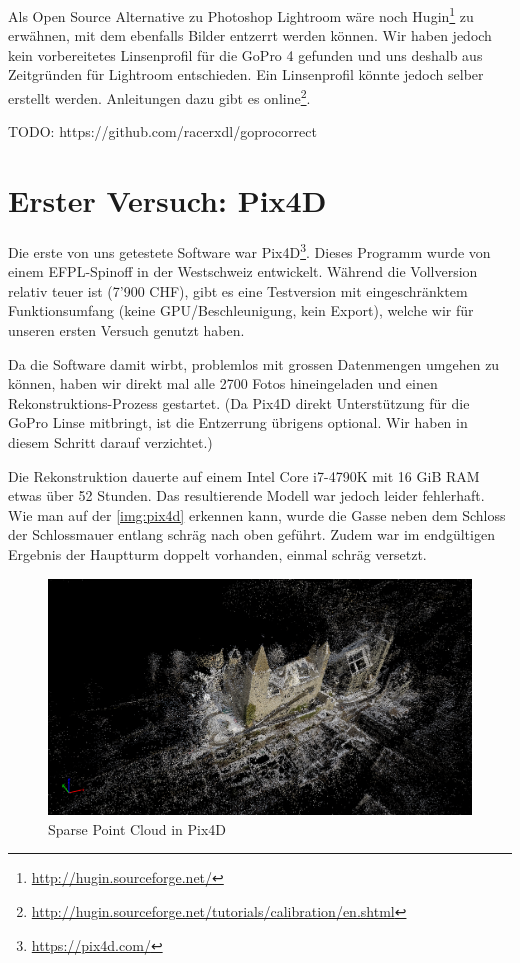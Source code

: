 Als Open Source Alternative zu Photoshop Lightroom wäre noch
Hugin\footnote{\url{http://hugin.sourceforge.net/}} zu erwähnen, mit dem
ebenfalls Bilder entzerrt werden können. Wir haben jedoch kein vorbereitetes
Linsenprofil für die GoPro 4 gefunden und uns deshalb aus Zeitgründen für
Lightroom entschieden. Ein Linsenprofil könnte jedoch selber erstellt werden.
Anleitungen dazu gibt es
online\footnote{\url{http://hugin.sourceforge.net/tutorials/calibration/en.shtml}}.

TODO: https://github.com/racerxdl/goprocorrect


\section{Erster Versuch: Pix4D}

Die erste von uns getestete Software war
Pix4D\footnote{\url{https://pix4d.com/}}. Dieses Programm wurde von einem
EFPL-Spinoff in der Westschweiz entwickelt. Während die Vollversion relativ
teuer ist (7'900 CHF), gibt es eine Testversion mit eingeschränktem
Funktionsumfang (keine GPU\-/Beschleunigung, kein Export), welche wir für
unseren ersten Versuch genutzt haben.

Da die Software damit wirbt, problemlos mit grossen Datenmengen umgehen zu
können, haben wir direkt mal alle 2700 Fotos hineingeladen und einen
Rekonstruktions-Prozess gestartet. (Da Pix4D direkt Unterstützung für die GoPro
Linse mitbringt, ist die Entzerrung übrigens optional. Wir haben in diesem
Schritt darauf verzichtet.)

Die Rekonstruktion dauerte auf einem Intel Core i7-4790K mit 16 GiB RAM etwas
über 52 Stunden. Das resultierende Modell war jedoch leider fehlerhaft. Wie man
auf der \autoref{img:pix4d} erkennen kann, wurde die Gasse neben dem Schloss
der Schlossmauer entlang schräg nach oben geführt. Zudem war im endgültigen
Ergebnis der Hauptturm doppelt vorhanden, einmal schräg versetzt.

\begin{figure}[H]
	\centering
	\includegraphics[width=\textwidth]{images/pix4d.png}
	\caption{Sparse Point Cloud in Pix4D}
	\label{img:pix4d}
\end{figure}

